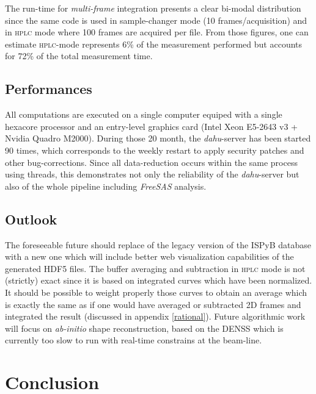 \documentclass[preprint]{iucr}              %
\begin{document}
The run-time for \textit{multi-frame} integration presents a clear bi-modal distribution since the same code is used in sample-changer mode (10 frames/acquisition) and in \textsc{hplc} mode where 100 frames are acquired per file.
From those figures, one can estimate \textsc{hplc}-mode represents 6\% of the measurement performed but accounts for 72\% of the total measurement time.

\subsection{Performances}

All computations are executed on a single computer equiped with a single hexacore processor and an entry-level graphics card (Intel Xeon E5-2643 v3 + Nvidia Quadro M2000). 
During those 20 month, the \textit{dahu}-server has been started 90 times, which corresponds to the weekly restart to apply security patches and other bug-corrections. 
Since all data-reduction occurs within the same process using threads, this demonstrates not only the reliability of the \textit{dahu}-server 
but also of the whole pipeline including \textit{FreeSAS} analysis.
\subsection{Outlook}

The foreseeable future should replace of the legacy version of the ISPyB database with a new one which will include better web visualization capabilities of the generated HDF5 files.
The buffer averaging and subtraction in \textsc{hplc} mode is not (strictly) exact since it is based on integrated curves which have been normalized.
It should be possible to weight properly those curves to obtain an average which is exactly the same as if one would have averaged or subtracted 2D frames and integrated the result (discussed in appendix \ref{rational}).
Future algorithmic work will focus on \textit{ab-initio} shape reconstruction, based on the DENSS \cite{denss} which is currently too slow to run with real-time constrains at the beam-line.

\section{Conclusion}
\end{document}
